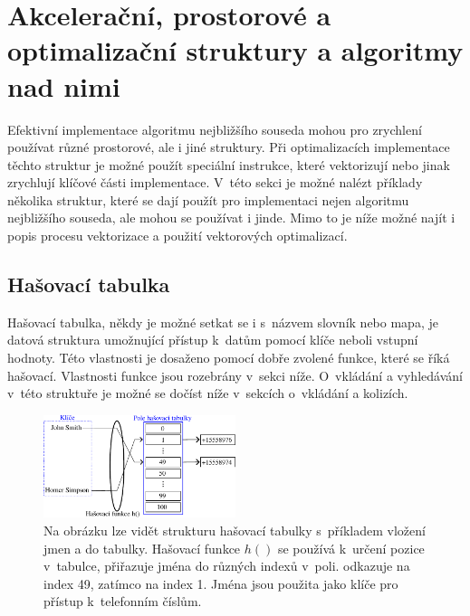 \chapter{Akcelerační, prostorové a optimalizační struktury a algoritmy nad nimi}
\label{teorie}

Efektivní implementace algoritmu nejbližšího souseda mohou pro zrychlení používat různé prostorové, ale i jiné struktury.  Při optimalizacích implementace těchto struktur je možné použít speciální instrukce, které vektorizují nebo jinak zrychlují klíčové části implementace. V~této sekci je možné nalézt příklady několika struktur, které se dají použít pro implementaci nejen algoritmu nejbližšího souseda, ale mohou se používat i jinde. Mimo to je níže možné najít i popis procesu vektorizace a použití vektorových optimalizací. 

\section{Hašovací tabulka}

Hašovací tabulka, někdy je možné setkat se i s~názvem slovník nebo mapa, je datová struktura umožnující přístup k~datům pomocí klíče neboli vstupní hodnoty. Této vlastnosti je dosaženo pomocí dobře zvolené funkce, které se říká hašovací. Vlastnosti funkce jsou rozebrány v~sekci níže. O~vkládání a vyhledávání v~této struktuře je možné se dočíst níže v~sekcích o~vkládání a kolizích.

\begin{figure}[!b]
    \centering
    \includegraphics[width=0.5\textwidth]{obrazky-figures/hash/HT_desc.pdf}
    \caption{
Na obrázku lze vidět strukturu hašovací tabulky s~příkladem vložení jmen  a  do tabulky. Hašovací funkce $h()$ se používá k~určení pozice v~tabulce, přiřazuje jména do různých indexů v~poli.  odkazuje na index 49, zatímco  na index 1. Jména jsou použita jako klíče pro přístup k~telefonním číslům.
}
    \label{fig:hash_definition}
\end{figure}


